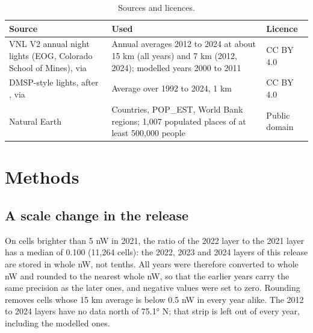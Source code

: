 \documentclass[11pt,a4paper]{article}
\begin{document}
\begin{table}[tbp]\centering\small\caption{Sources and licences.}\label{tab:sources}\begin{tabular}{>{\raggedright\arraybackslash}p{3.6cm}>{\raggedright\arraybackslash}p{7.6cm}>{\raggedright\arraybackslash}p{2.6cm}}\toprule Source & Used & Licence\\\midrule
VNL V2 annual night lights (EOG, Colorado School of Mines), via \citet{hengl} & Annual averages 2012 to 2024 at about 15 km (all years) and 7 km (2012, 2024); modelled years 2000 to 2011 & CC BY 4.0\\
DMSP-style lights, after \citet{li2020}, via \citet{hengl} & Average over 1992 to 2024, 1 km & CC BY 4.0\\
Natural Earth & Countries, POP\_EST, World Bank regions; 1,007 populated places of at least 500,000 people & Public domain\\
\bottomrule\end{tabular}\end{table}

\section{Methods}
\subsection{A scale change in the release}
On cells brighter than 5 nW in 2021, the ratio of the 2022 layer to the 2021 layer has a median of 0.100 (11,264 cells): the 2022, 2023 and 2024 layers of this release are stored in whole nW, not tenths. All years were therefore converted to whole nW and rounded to the nearest whole nW, so that the earlier years carry the same precision as the later ones, and negative values were set to zero. Rounding removes cells whose 15 km average is below 0.5 nW in every year alike. The 2012 to 2024 layers have no data north of 75.1° N; that strip is left out of every year, including the modelled ones.
\end{document}
